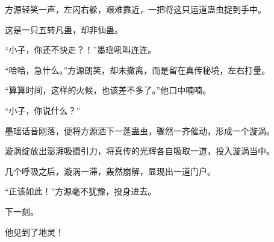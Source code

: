 \begin{this_body}
方源轻笑一声，左闪右躲，艰难靠近，一把将这只运道蛊虫捉到手中。

这是一只五转凡蛊，却非仙蛊。

“小子，你还不快走？！”墨瑶吼叫连连。

“哈哈，急什么。”方源朗笑，却未撤离，而是留在真传秘境，左右打量。

“算算时间，这样的火候，也该差不多了。”他口中喃喃。

“小子，你说什么？”

墨瑶话音刚落，便将方源洒下一蓬蛊虫，骤然一齐催动，形成一个漩涡。

漩涡绽放出澎湃吸摄引力，将真传的光辉各自吸取一道，投入漩涡当中。

几个呼吸之后，漩涡一滞，轰然崩解，显现出一道门户。

“正该如此！”方源毫不犹豫，投身进去。

下一刻。

他见到了地灵！

\end{this_body}

